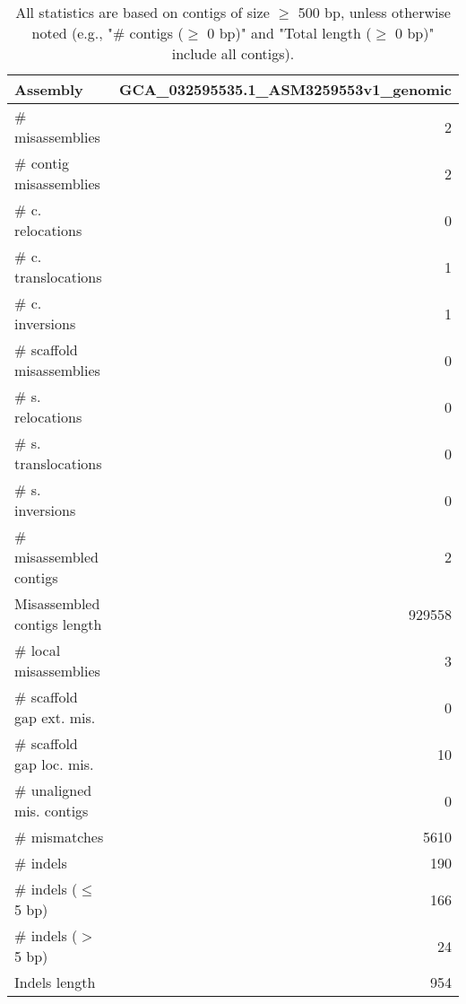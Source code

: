 \documentclass[12pt,a4paper]{article}
\begin{document}
\begin{table}[ht]
\begin{center}
\caption{All statistics are based on contigs of size $\geq$ 500 bp, unless otherwise noted (e.g., "\# contigs ($\geq$ 0 bp)" and "Total length ($\geq$ 0 bp)" include all contigs).}
\begin{tabular}{|l*{1}{|r}|}
\hline
Assembly & GCA\_032595535.1\_ASM3259553v1\_genomic \\ \hline
\# misassemblies & 2 \\ \hline
\hspace{2mm}\# contig misassemblies & 2 \\ \hline
\hspace{5mm}\# c. relocations & 0 \\ \hline
\hspace{5mm}\# c. translocations & 1 \\ \hline
\hspace{5mm}\# c. inversions & 1 \\ \hline
\hspace{2mm}\# scaffold misassemblies & 0 \\ \hline
\hspace{5mm}\# s. relocations & 0 \\ \hline
\hspace{5mm}\# s. translocations & 0 \\ \hline
\hspace{5mm}\# s. inversions & 0 \\ \hline
\# misassembled contigs & 2 \\ \hline
Misassembled contigs length & 929558 \\ \hline
\# local misassemblies & 3 \\ \hline
\# scaffold gap ext. mis. & 0 \\ \hline
\# scaffold gap loc. mis. & 10 \\ \hline
\# unaligned mis. contigs & 0 \\ \hline
\# mismatches & 5610 \\ \hline
\# indels & 190 \\ \hline
\hspace{5mm}\# indels ($\leq$ 5 bp) & 166 \\ \hline
\hspace{5mm}\# indels ($>$ 5 bp) & 24 \\ \hline
Indels length & 954 \\ \hline
\end{tabular}
\end{center}
\end{table}
\end{document}
